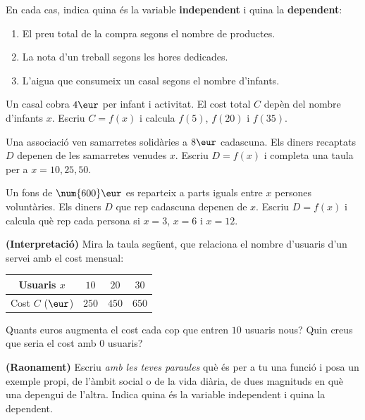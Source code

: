 \begin{exercicis}
\begin{exlist}
  \item En cada cas, indica quina és la variable \textbf{independent} i quina la
        \textbf{dependent}:
    \begin{enumerate}[label=\alph*), leftmargin=1.6em, topsep=2pt]
      \item El preu total de la compra segons el nombre de productes.
      \item La nota d'un treball segons les hores dedicades.
      \item L'aigua que consumeix un casal segons el nombre d'infants.
    \end{enumerate}
  \item Un casal cobra $4\eur$ per infant i activitat. El cost total $C$ depèn del
        nombre d'infants $x$. Escriu $C=f(x)$ i calcula $f(5)$, $f(20)$ i $f(35)$.
  \item Una associació ven samarretes solidàries a $8\eur$ cadascuna. Els diners
        recaptats $D$ depenen de les samarretes venudes $x$. Escriu $D=f(x)$ i
        completa una taula per a $x=10,25,50$.
  \item Un fons de $\num{600}\eur$ es reparteix a parts iguals entre $x$ persones
        voluntàries. Els diners $D$ que rep cadascuna depenen de $x$. Escriu
        $D=f(x)$ i calcula què rep cada persona si $x=3$, $x=6$ i $x=12$.
  \item \textbf{(Interpretació)} Mira la taula següent, que relaciona el nombre
        d'usuaris d'un servei amb el cost mensual:
        \begin{center}
        \begin{tabular}{c c c c}
        \toprule
        Usuaris $x$ & $10$ & $20$ & $30$ \\
        \midrule
        Cost $C$ ($\eur$) & $250$ & $450$ & $650$ \\
        \bottomrule
        \end{tabular}
        \end{center}
        Quants euros augmenta el cost cada cop que entren $10$ usuaris nous? Quin
        creus que seria el cost amb $0$ usuaris?
  \item \textbf{(Raonament)} Escriu \emph{amb les teves paraules} què és per a tu una
        funció i posa un exemple propi, de l'àmbit social o de la vida diària, de
        dues magnituds en què una depengui de l'altra. Indica quina és la variable
        independent i quina la dependent.
\end{exlist}
\end{exercicis}

